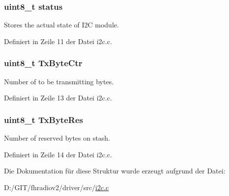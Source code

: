 \hypertarget{struct_i2_c___c_t_r_l_ade818037fd6c985038ff29656089758d}{}
\subsubsection[{status}]{\setlength{\rightskip}{0pt plus 5cm}uint8\+\_\+t {\bf status}}\label{struct_i2_c___c_t_r_l_ade818037fd6c985038ff29656089758d}


Stores the actual state of I2\+C module. 



Definiert in Zeile 11 der Datei i2c.\+c.

\hypertarget{struct_i2_c___c_t_r_l_aec22639ad7dc7eed52b3e116ea3223fe}{}
\subsubsection[{Tx\+Byte\+Ctr}]{\setlength{\rightskip}{0pt plus 5cm}uint8\+\_\+t Tx\+Byte\+Ctr}\label{struct_i2_c___c_t_r_l_aec22639ad7dc7eed52b3e116ea3223fe}


Number of to be transmitting bytes. 



Definiert in Zeile 13 der Datei i2c.\+c.

\hypertarget{struct_i2_c___c_t_r_l_a28b787f8db17314755d031d75ec38017}{}
\subsubsection[{Tx\+Byte\+Res}]{\setlength{\rightskip}{0pt plus 5cm}uint8\+\_\+t Tx\+Byte\+Res}\label{struct_i2_c___c_t_r_l_a28b787f8db17314755d031d75ec38017}


Number of reserved bytes on stash. 



Definiert in Zeile 14 der Datei i2c.\+c.



Die Dokumentation für diese Struktur wurde erzeugt aufgrund der Datei\+:\begin{DoxyCompactItemize}
\item 
D\+:/\+G\+I\+T/fhradiov2/driver/src/\hyperlink{i2c_8c}{i2c.\+c}\end{DoxyCompactItemize}
